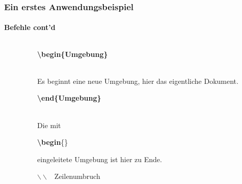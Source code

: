 \begin{frame}
\frametitle{Ein erstes Anwendungsbeispiel}
\framesubtitle{Befehle cont'd}
\begin{columns}
\begin{column}{0.6\textwidth}
\begin{ttfamily}\scriptsize

 \normalsize
\end{ttfamily}
\end{column}
\begin{column}{0.4\textwidth}
\begin{ttfamily}\textbf{\color{unibablueI}\textbackslash begin\color{black}\{Umgebung\}}\end{ttfamily}\\
Es beginnt eine neue Umgebung, hier das eigentliche Dokument.\\[5mm]

\begin{ttfamily}\textbf{\color{unibablueI}\textbackslash end\color{black}\{Umgebung\}}\end{ttfamily}\\
Die mit \begin{ttfamily}\textbf{\color{unibablueI}\textbackslash begin}\color{black}\{\}\end{ttfamily}
eingeleitete Umgebung ist hier zu Ende.\\[5mm]

\begin{ttfamily}\textbf{\color{nounibaredII}$\backslash\backslash$}\color{black}
~Zeilenumbruch\end{ttfamily}\\
\end{column}
\end{columns}
\end{frame}



